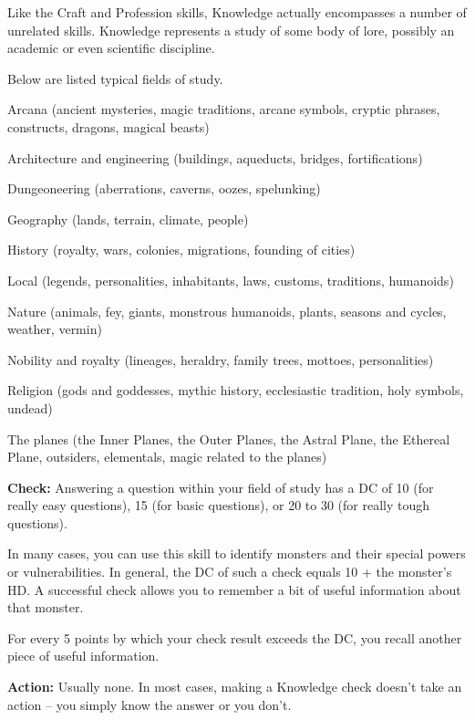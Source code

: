 
Like the Craft and Profession skills, Knowledge actually encompasses a number of 
unrelated skills. Knowledge represents a study of some body of lore, possibly an 
academic or even scientific discipline.

Below are listed typical fields of study.

\begin{itemize*}
\item Arcana (ancient mysteries, magic traditions, arcane symbols, cryptic phrases, constructs, dragons, magical beasts)
\item Architecture and engineering (buildings, aqueducts, bridges, fortifications)
\item Dungeoneering (aberrations, caverns, oozes, spelunking)
\item Geography (lands, terrain, climate, people)
\item History (royalty, wars, colonies, migrations, founding of cities)
\item Local (legends, personalities, inhabitants, laws, customs, traditions, humanoids)
\item Nature (animals, fey, giants, monstrous humanoids, plants, seasons and cycles, weather, vermin)
\item Nobility and royalty (lineages, heraldry, family trees, mottoes, personalities)
\item Religion (gods and goddesses, mythic history, ecclesiastic tradition, holy symbols, undead)
\end{itemize*}

The planes (the Inner Planes, the Outer Planes, the Astral Plane, the Ethereal 
Plane, outsiders, elementals, magic related to the planes)

\textbf{Check:} Answering a question within your field of study has a DC of 10 
(for really easy questions), 15 (for basic questions), or 20 to 30 (for really 
tough questions).

In many cases, you can use this skill to identify monsters and their special powers 
or vulnerabilities. In general, the DC of such a check equals 10 + the monster's 
HD. A successful check allows you to remember a bit of useful information about 
that monster.

For every 5 points by which your check result exceeds the DC, you recall another 
piece of useful information.

\textbf{Action:} Usually none. In most cases, making a Knowledge check doesn't 
take an action -- you simply know the answer or you don't.

